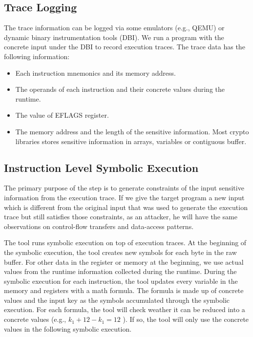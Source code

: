 \subsection{Trace Logging}
The trace information can be logged via some emulators (e.g., QEMU) or dynamic binary instrumentation tools (DBI). 
We run a program with the concrete input under the DBI to record execution traces.
The trace data has the following information:
\begin{itemize}
     \item Each instruction mnemonics and its memory address.
     \item The operands of each instruction and their concrete values during the runtime.
     \item The value of EFLAGS register. 
     \item The memory address and the length of the sensitive information.
      Most crypto libraries stores sensitive information in arrays,
      variables or contiguous buffer.
\end{itemize}

\subsection{Instruction Level Symbolic Execution}
\label{InstructionSE}
The primary purpose of the step is to generate constraints of the input sensitive information from the execution trace. If we give the target program a new input which is different from the original input that was used to generate the execution trace but still satisfies those constraints, as an attacker, he will have the same observations on control-flow transfers and data-access patterns.

The tool runs symbolic execution on top of execution traces. At the beginning of the symbolic execution, the tool creates new symbols for each byte in the raw buffer. For other data in the register or memory at the beginning, we use actual values from the runtime information collected during the runtime. During the symbolic execution for each instruction, the tool updates every variable in the memory and registers with a math formula. The formula is made up of concrete values and the input key as the symbols accumulated through the symbolic execution.
For each formula, the tool will check weather it can be reduced into a concrete values (e.g., $k_1+12-k_1 = 12$ ). If so, the tool will only use the concrete values in the following symbolic execution.

